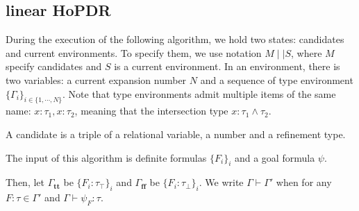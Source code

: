 \documentclass[runningheads]{llncs}
\newcommand\COL{\mathbin{:}}
\newcommand \true {\textbf{tt}}
\newcommand \false {\textbf{ff}}
\begin{document}
\subsection{linear HoPDR}

During the execution of the following algorithm,
we hold two states: candidates and current environments.
To specify them, we use notation \( M \mid \mid S \), where
\( M \) specify candidates and \( S \) is a current environment.
%
In an environment, there is two variables:
a current expansion number \( N \)
and a sequence of type environment \( \{\Gamma_i\}_{i \in \{1, \cdots, N\}} \). Note that type environments admit multiple items of the same name: \( x: \tau_1, x: \tau_2 \), meaning that the intersection type \( x: \tau_1 \wedge \tau_2 \).

A candidate is a triple of a relational variable, a number and a refinement type.

The input of this algorithm is definite formulas \(\{F_i\}_i\) and a goal formula
\(\psi\).

Then, let \( \Gamma_\true \) be \( \{F_i: \tau_\top\}_i \)
and \( \Gamma_\false \) be \( \{F_i: \tau_\bot \}_i \).
We write \( \Gamma \vdash \Gamma' \) when for any \( F \COL \tau \in \Gamma' \)
and \( \Gamma \vdash \psi_F \COL \tau \).
\end{document}
